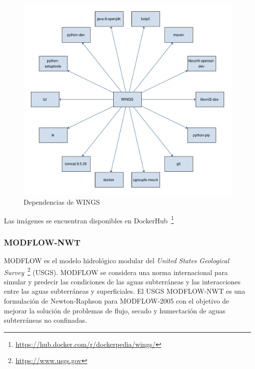 \begin{figure}[t]
\centering
\includegraphics[width=.8\textwidth]{Figures/wings-deps}
\caption{Dependencias de WINGS}\label{fig:wings-deps}
\end{figure}

Las imágenes se encuentran disponibles en DockerHub~\footnote{\url{https://hub.docker.com/r/dockerpedia/wings/}}


\subsubsection{MODFLOW-NWT}

MODFLOW es el modelo hidrológico modular del \textit{United States Geological Survey}~\footnote{\url{https://www.usgs.gov}} (USGS). MODFLOW se considera una norma internacional para simular y predecir las condiciones de las aguas subterráneas y las interacciones entre las aguas subterráneas y superficiales.
El USGS MODFLOW-NWT es una formulación de Newton-Raphson para MODFLOW-2005 con el objetivo de mejorar la solución de problemas de flujo, secado y humectación de aguas subterráneas no confinadas.

